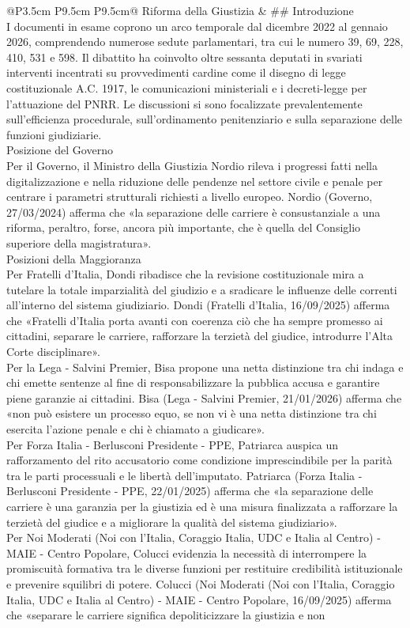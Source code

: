 \documentclass[a4paper,11pt]{article}
\begin{document}
\begin{landscape}
\begin{longtable}{@{}P{3.5cm} P{9.5cm} P{9.5cm}@{}}
Riforma della Giustizia & \#\# Introduzione\\[6pt] I documenti in esame coprono un arco temporale dal dicembre 2022 al gennaio 2026, comprendendo numerose sedute parlamentari, tra cui le numero 39, 69, 228, 410, 531 e 598. Il dibattito ha coinvolto oltre sessanta deputati in svariati interventi incentrati su provvedimenti cardine come il disegno di legge costituzionale A.C. 1917, le comunicazioni ministeriali e i decreti-legge per l'attuazione del PNRR. Le discussioni si sono focalizzate prevalentemente sull'efficienza procedurale, sull'ordinamento penitenziario e sulla separazione delle funzioni giudiziarie.\\[6pt] Posizione del Governo\\[6pt] Per il Governo, il Ministro della Giustizia Nordio rileva i progressi fatti nella digitalizzazione e nella riduzione delle pendenze nel settore civile e penale per centrare i parametri strutturali richiesti a livello europeo. Nordio (Governo, 27/03/2024) afferma che «la separazione delle carriere è consustanziale a una riforma, peraltro, forse, ancora più importante, che è quella del Consiglio superiore della magistratura».\\[6pt] Posizioni della Maggioranza\\[6pt] Per Fratelli d'Italia, Dondi ribadisce che la revisione costituzionale mira a tutelare la totale imparzialità del giudizio e a sradicare le influenze delle correnti all'interno del sistema giudiziario. Dondi (Fratelli d'Italia, 16/09/2025) afferma che «Fratelli d'Italia porta avanti con coerenza ciò che ha sempre promesso ai cittadini, separare le carriere, rafforzare la terzietà del giudice, introdurre l'Alta Corte disciplinare».\\[6pt] Per la Lega - Salvini Premier, Bisa propone una netta distinzione tra chi indaga e chi emette sentenze al fine di responsabilizzare la pubblica accusa e garantire piene garanzie ai cittadini. Bisa (Lega - Salvini Premier, 21/01/2026) afferma che «non può esistere un processo equo, se non vi è una netta distinzione tra chi esercita l'azione penale e chi è chiamato a giudicare».\\[6pt] Per Forza Italia - Berlusconi Presidente - PPE, Patriarca auspica un rafforzamento del rito accusatorio come condizione imprescindibile per la parità tra le parti processuali e le libertà dell'imputato. Patriarca (Forza Italia - Berlusconi Presidente - PPE, 22/01/2025) afferma che «la separazione delle carriere è una garanzia per la giustizia ed è una misura finalizzata a rafforzare la terzietà del giudice e a migliorare la qualità del sistema giudiziario».\\[6pt] Per Noi Moderati (Noi con l'Italia, Coraggio Italia, UDC e Italia al Centro) - MAIE - Centro Popolare, Colucci evidenzia la necessità di interrompere la promiscuità formativa tra le diverse funzioni per restituire credibilità istituzionale e prevenire squilibri di potere. Colucci (Noi Moderati (Noi con l'Italia, Coraggio Italia, UDC e Italia al Centro) - MAIE - Centro Popolare, 16/09/2025) afferma che «separare le carriere significa depoliticizzare la giustizia e non 
\end{longtable}
\end{landscape}
\end{document}
